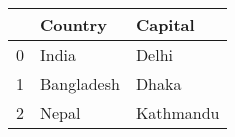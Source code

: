 \begin{tabular}{lll}
\toprule
{} &     Country &    Capital \\
\midrule
0 &       India &      Delhi \\
1 &  Bangladesh &      Dhaka \\
2 &       Nepal &  Kathmandu \\
\bottomrule
\end{tabular}
